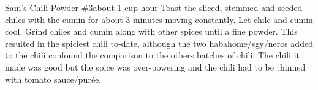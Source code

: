\begin{recipe}{Sam's Chili Powder \#3}{about 1 cup}{ hour}
Toast the sliced, stemmed and seeded chiles with the cumin for about 3 minutes moving constantly.  Let chile and cumin cool.
Grind chiles and cumin along with other spices until a fine powder.
\freeform This resulted in the spiciest chili to-date, although the two haba\/home/sgy/{n}eros added to the chili confound the comparison to the others batches of chili.  The chili it made was good but the spice was over-powering and the chili had to be thinned with tomato sauce/pur\'{e}e.
\end{recipe}
